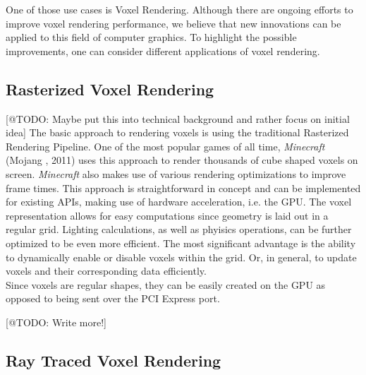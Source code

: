 \noindent
One of those use cases is Voxel Rendering. Although there are ongoing efforts to improve voxel 
rendering performance, we believe that new innovations can be applied to this field of computer 
graphics. To highlight the possible improvements, one can consider different applications of 
voxel rendering. 

\subsection{Rasterized Voxel Rendering}

[@TODO: Maybe put this into technical background and rather focus on initial idea]
The basic approach to rendering voxels is using the traditional Rasterized Rendering Pipeline.
One of the most popular games of all time, \emph{Minecraft} (Mojang \cite{Mojang2024}, 2011) uses this approach to 
render thousands of cube shaped voxels on screen. \emph{Minecraft} also makes use of various rendering 
optimizations to improve frame times. This approach is straightforward in concept and can be 
implemented for existing \ac{API}s, making use of hardware acceleration, i.e. the \ac{GPU}.
The voxel representation allows for easy computations since geometry is laid out in a regular grid.
Lighting calculations, as well as phyisics operations, can be further optimized to be even more 
efficient. The most significant advantage is the ability to dynamically enable or disable voxels 
within the grid. Or, in general, to update voxels and their corresponding data efficiently.\\

\noindent
Since voxels are regular shapes, they can be easily created on the \ac{GPU} as opposed to being 
sent over the \ac{PCI Express} port. 

[@TODO: Write more!]


\subsection{Ray Traced Voxel Rendering}

